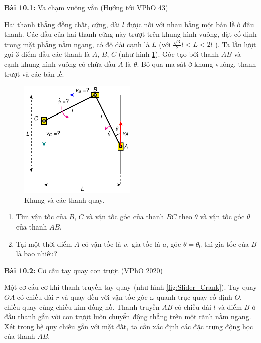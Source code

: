 \textbf{Bài 10.1:} Va chạm vuông vắn (Hướng tới VPhO 43)

Hai thanh thẳng đồng chất, cứng, dài \(l\) được nối với nhau bằng một bản lề ở đầu thanh. 
Các đầu của hai thanh cứng này trượt trên khung hình vuông, đặt cố định trong mặt phẳng nằm ngang, có độ dài cạnh là \(L\) (với \(\frac{\sqrt{3}}{2}l<L<2l\) ). 
Ta lần lượt gọi 3 điểm đầu các thanh là \(A\), \(B\), \(C\) (như hình \ref{fig:Square_collision}). Góc tạo bởi thanh \(AB\) và cạnh khung hình vuông có chứa đầu \(A\) là \(\theta\). Bỏ qua ma sát ở khung vuông, thanh trượt và các bản lề.

\begin{figure}[!h]
    \centering
    \includegraphics[width=0.5\textwidth]{Tuan10/Figures/Square_collision/Square_Collision.pdf}
    \caption{Khung và các thanh quay.}
    \label{fig:Square_collision}
\end{figure}

\begin{enumerate}
    \item Tìm vận tốc của \(B\), \(C\) và vận tốc góc của thanh \(BC\) theo \(\theta\) và vận tốc góc \(\dot{\theta}\) của thanh \(AB\).
    \item Tại một thời điểm \(A\) có vận tốc là \(v\), gia tốc là \(a\), góc \(\theta=\theta_0\) thì gia tốc của \(B\) là bao nhiêu?
\end{enumerate}

\textbf{Bài 10.2:} Cơ cấu tay quay con trượt (VPhO 2020)

Một cơ cấu cơ khí thanh truyền tay quay (như hình \ref{fig:Slider_Crank}). 
Tay quay \(OA\) có chiều dài \(r\) và quay đều với vận tốc góc \(\omega\) quanh trục quay cố định \(O\), chiều quay cùng chiều kim đồng hồ. 
Thanh truyền \(AB\) có chiều dài \(l\) và điểm \(B\) ở đầu thanh gắn với con trượt luôn chuyển động thẳng trên một rãnh nằm ngang. 
Xét trong hệ quy chiếu gắn với mặt đất, ta cần xác định các đặc trưng động học của thanh \(AB\).

